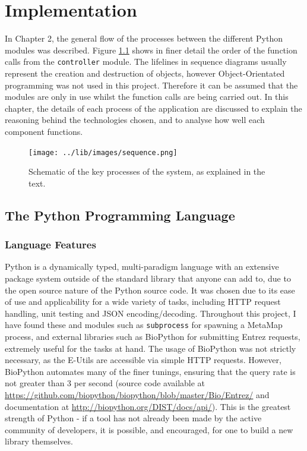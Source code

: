 \documentclass[Report.tex]{subfiles}
\begin{document}
\chapter{Implementation}
In Chapter 2, the general flow of the processes between the different Python modules was described. Figure \ref{fig:sequence} shows in finer detail the order of the function calls from the \texttt{controller} module. The lifelines in sequence diagrams usually represent the creation and destruction of objects, however Object-Orientated programming was not used in this project. Therefore it can be assumed that the modules are only in use whilst the function calls are being carried out. In this chapter, the details of each process of the application are discussed to explain the reasoning behind the technologies chosen, and to analyse how well each component functions.

\begin{figure}[h!]
\texttt{[image: ../lib/images/sequence.png]}
\caption{Schematic of the key processes of the system, as explained in the text.}
\label{fig:sequence}
\end{figure}

\section{The Python Programming Language}
\subsection{Language Features}
Python is a dynamically typed, multi-paradigm language with an extensive package system outside of the standard library that anyone can add to, due to the open source nature of the Python source code\cite{pythonabout}. It was chosen due to its ease of use and applicability for a wide variety of tasks, including HTTP request handling, unit testing and JSON encoding/decoding. Throughout this project, I have found these and modules such as \texttt{subprocess} for spawning a MetaMap process, and external libraries such as BioPython for submitting Entrez requests, extremely useful for the tasks at hand. The usage of BioPython was not strictly necessary, as the E-Utils are accessible via simple HTTP requests. However, BioPython automates many of the finer tunings, ensuring that the query rate is not greater than 3 per second (source code available at \url{https://github.com/biopython/biopython/blob/master/Bio/Entrez/} and documentation at \url{http://biopython.org/DIST/docs/api/}). This is the greatest strength of Python - if a tool has not already been made by the active community of developers, it is possible, and encouraged, for one to build a new library themselves. \newline
\end{document}
